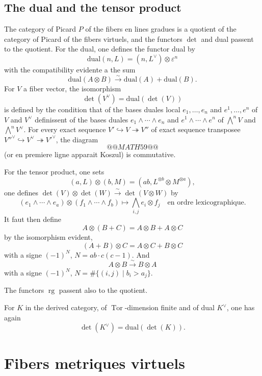 \documentclass[12pt,a4paper]{article}
\theoremstyle{plain}
\theoremstyle{definition}
\DeclareMathOperator{\rank}{rg}
\DeclareMathOperator{\Tor}{Tor}
\begin{document}
\subsection{The dual and the tensor product}

The category of Picard $P$ of the fibers en lines gradues is a quotient
of the category of Picard of the fibers virtuels, and the functors $\det$ and dual passent
to the quotient. For the dual, one defines the functor dual by
\[
\text{dual}(n, L) = (n, L^\vee) \otimes \varepsilon^n
\]
with the compatibility evidente a the sum
\[
\text{dual}(A \otimes B) \xrightarrow{\sim} \text{dual}(A) + \text{dual}(B) .
\]
For $V$ a fiber vector, the isomorphism
\[
\det(V^\vee) = \text{dual}(\det(V))
\]
is defined by the condition that of the bases duales local $e_1, \ldots, e_n$ and $e^1, \ldots,
e^n$ of $V$ and $V^\vee$ definissent of the bases duales $e_1 \wedge \cdots \wedge e_n$ and $e^1 \wedge \cdots \wedge
e^n$ of $\bigwedge^n V$ and $\bigwedge^n V^\vee$. For every exact sequence $V' \hookrightarrow V \twoheadrightarrow V''$ of exact sequence transposee
$V''^\vee \hookrightarrow V^\vee \twoheadrightarrow V'^\vee$, the diagram
\[
@@MATH59@@
\]
(or en premiere ligne apparait Koszul) is commutative.

For the tensor product, one sets
\[
(a, L) \otimes (b, M) = (ab, L^{\otimes b} \otimes M^{\otimes a}) ,
\]
one defines $\det(V) \otimes \det(W) \xrightarrow{\sim} \det(V \otimes W)$ by
\[
(e_1 \wedge \cdots \wedge e_a) \otimes (f_1 \wedge \cdots \wedge f_b) \longmapsto \bigwedge_{i,j} e_i \otimes f_j \quad \text{en ordre lexicographique.}
\]
It faut then define
\[
A \otimes (B + C) = A \otimes B + A \otimes C
\]
by the isomorphism evident,
\[
(A + B) \otimes C = A \otimes C + B \otimes C
\]
with a signe $(-1)^N$, $N = ab \cdot c(c-1)$. And
\[
A \otimes B \xrightarrow{\sim} B \otimes A
\]
with a signe $(-1)^N$, $N = \#\{(i,j) \mid b_i > a_j\}$.

The functors $\rank$ passent also to the quotient.

For $K$ in the derived category, of $\Tor$-dimension finite and of dual $K^\vee$,
one has again
\[
\det(K^\vee) = \text{dual}(\det(K)) .
\]



\section{Fibers metriques virtuels}

\subsection{}
\end{document}
